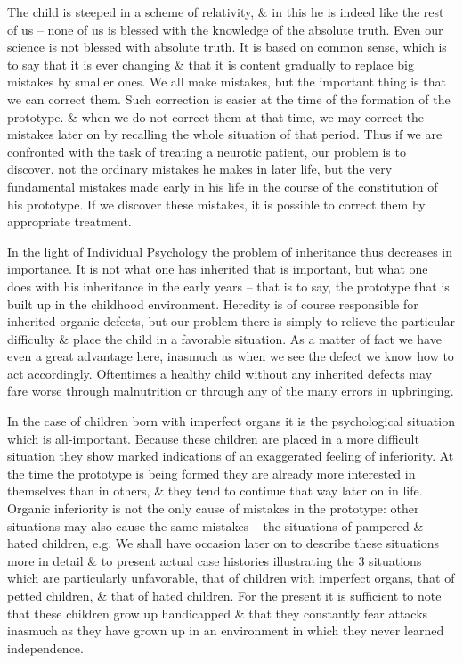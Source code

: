 \documentclass{article}
\begin{document}
The child is steeped in a scheme of relativity, \& in this he is indeed like the rest of us -- none of us is blessed with the knowledge of the absolute truth. Even our science is not blessed with absolute truth. It is based on common sense, which is to say that it is ever changing \& that it is content gradually to replace big mistakes by smaller ones. We all make mistakes, but the important thing is that we can correct them. Such correction is easier at the time of the formation of the prototype. \& when we do not correct them at that time, we may correct the mistakes later on by recalling the whole situation of that period. Thus if we are confronted with the task of treating a neurotic patient, our problem is to discover, not the ordinary mistakes he makes in later life, but the very fundamental mistakes made early in his life in the course of the constitution of his prototype. If we discover these mistakes, it is possible to correct them by appropriate treatment.

In the light of Individual Psychology the problem of inheritance thus decreases in importance. It is not what one has inherited that is important, but what one does with his inheritance in the early years -- that is to say, the prototype that is built up in the childhood environment. Heredity is of course responsible for inherited organic defects, but our problem there is simply to relieve the particular difficulty \& place the child in a favorable situation. As a matter of fact we have even a great advantage here, inasmuch as when we see the defect we know how to act accordingly. Oftentimes a healthy child without any inherited defects may fare worse through malnutrition or through any of the many errors in upbringing.

In the case of children born with imperfect organs it is the psychological situation which is all-important. Because these children are placed in a more difficult situation they show marked indications of an exaggerated feeling of inferiority. At the time the prototype is being formed they are already more interested in themselves than in others, \& they tend to continue that way later on in life. Organic inferiority is not the only cause of mistakes in the prototype: other situations may also cause the same mistakes -- the situations of pampered \& hated children, e.g. We shall have occasion later on to describe these situations more in detail \& to present actual case histories illustrating the 3 situations which are particularly unfavorable, that of children with imperfect organs, that of petted children, \& that of hated children. For the present it is sufficient to note that these children grow up handicapped \& that they constantly fear attacks inasmuch as they have grown up in an environment in which they never learned independence.
\end{document}
